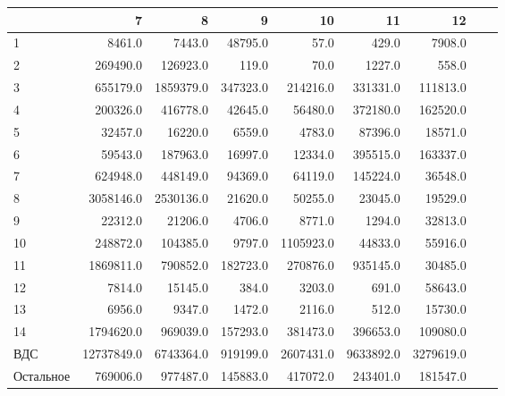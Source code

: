 \documentclass[12pt, a4paper]{article}
\begin{document}
\begin{tabular}{|l|rrrrrrrr|}
\hline
& 7 &          8 &         9 &         10 &         11 &         12 &      \\
\hline
1 & 8461.0 &     7443.0 &   48795.0 &       57.0 &      429.0 &     7908.0 \\
2 &   269490.0 &   126923.0 &     119.0 &       70.0 &     1227.0 &      558.0 \\
3&    655179.0 &  1859379.0 &  347323.0 &   214216.0 &   331331.0 &   111813.0\\
4&200326.0 &   416778.0 &   42645.0 &    56480.0 &   372180.0 &   162520.0 \\
5&32457.0 &    16220.0 &    6559.0 &     4783.0 &    87396.0 &    18571.0 \\
6&59543.0 &   187963.0 &   16997.0 &    12334.0 &   395515.0 &   163337.0\\
7&624948.0 &   448149.0 &   94369.0 &    64119.0 &   145224.0 &    36548.0 \\
8&3058146.0 &  2530136.0 &   21620.0 &    50255.0 &    23045.0 &    19529.0\\
9&22312.0 &    21206.0 &    4706.0 &     8771.0 &     1294.0 &    32813.0  \\
10&  248872.0 &   104385.0 &    9797.0 &  1105923.0 &    44833.0 &    55916.0\\
11&1869811.0 &   790852.0 &  182723.0 &   270876.0 &   935145.0 &    30485.0 \\
12&7814.0 &    15145.0 &     384.0 &     3203.0 &      691.0 &    58643.0 \\
13&6956.0 &     9347.0 &    1472.0 &     2116.0 &      512.0 &    15730.0 \\
14&1794620.0 &   969039.0 &  157293.0 &   381473.0 &   396653.0 &   109080.0 \\
ВДС&  12737849.0 &  6743364.0 &  919199.0 &  2607431.0 &  9633892.0 &  3279619.0 \\
Остальное& 769006.0 &   977487.0 &  145883.0 &   417072.0 &   243401.0 &   181547.0  \\
\end{tabular}
\end{document}
